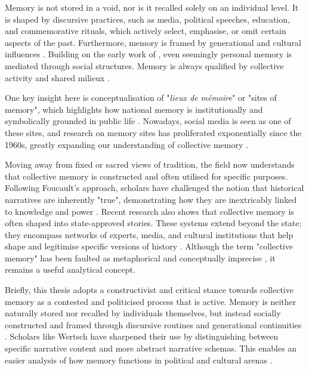 Memory is not stored in a void, nor is it recalled solely on an individual level. It is shaped by discursive practices, such as media, political speeches, education, and commemorative rituals, which actively select, emphasise, or omit certain aspects of the past. Furthermore, memory is framed by generational and cultural influences \citep{wydra_generations_2018}. Building on the early work of \citet{halbwachs_space_1980}, even seemingly personal memory is mediated through social structures. Memory is always qualified by collective activity and shared milieux  \citep{wertsch_narrative_2008}.

One key insight here is  conceptualisation of "\textit{lieux de mémoire}" or "sites of memory", which highlights how national memory is institutionally and symbolically grounded in public life \citep{olick_social_1998}. Nowadays, social media is seen as one of these sites, and research on memory sites has proliferated exponentially since the 1960s, greatly expanding our understanding of collective memory \citep{wang_internet_2025}.

Moving away from fixed or sacred views of tradition, the field now understands that collective memory is constructed and often utilised for specific purposes. Following Foucault’s approach, scholars have challenged the notion that historical narratives are inherently "true", demonstrating how they are inextricably linked to knowledge and power \citep{olick_social_1998}. Recent research also shows that collective memory is often shaped into state-approved stories. These systems extend beyond the state; they encompass networks of experts, media, and cultural institutions that help shape and legitimise specific versions of history \citep{dujisin_reassessing_2024}. Although the term "collective memory" has been faulted as metaphorical and conceptually imprecise \citep{gedi_collective_1996}, it remains a useful analytical concept.

Briefly, this thesis adopts a constructivist and critical stance towards collective memory as a contested and politicised process that is active. Memory is neither naturally stored nor recalled by individuals themselves, but instead socially constructed and framed through discursive routines and generational continuities \citep{wydra_generations_2018}.  Scholars like Wertsch have sharpened their use by distinguishing between specific narrative content and more abstract narrative schemas. This enables an easier analysis of how memory functions in political and cultural arenas \citep{wertsch_narrative_2008}.

